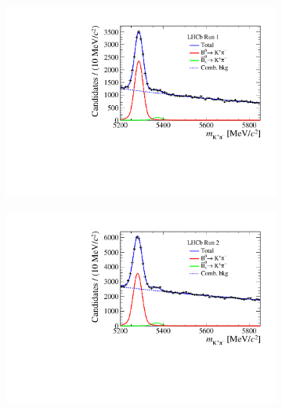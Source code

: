 {{\begin{figure}[tbp]
    \label{fig:Bujpsikyield}
\end{figure}
\begin{figure}[tbp]
    \centering
  \begin{subfigure}[b]{0.48\textwidth}
        \includegraphics[width=  \textwidth]{./Figs/BFAnalysis/Bd2KPi_mass_RunI_BDTbinNone.pdf}
    \end{subfigure}
    \begin{subfigure}[b]{0.48\textwidth}
       \includegraphics[width=\textwidth]{./Figs/BFAnalysis/Bd2KPi_mass_RunII_BDTbinNone.pdf}

\end{subfigure}
\end{figure}}}
